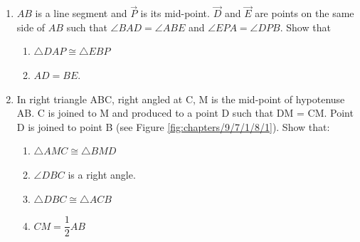 \begin{enumerate}[label=\thesection.\arabic*,ref=\thesection.\theenumi]
\\
\solution

\item 
	$AB$ is a line segment and $\vec{P}$ is its mid-point. $\vec{D}$ and $\vec{E}$ are points on the same side of
$AB$ such that $\angle BAD = \angle ABE$ and $\angle EPA = \angle DPB$. Show that
\label{chapters/9/7/1/7}
\begin{enumerate}
\item $\triangle DAP \cong \triangle EBP$
\item $AD = BE$.
\end{enumerate}
\solution

\item In right triangle ABC, right angled at C, M is the mid-point of hypotenuse AB. C is joined to M and produced to a point D such that DM = CM. Point D is joined to point B (see Figure \ref{fig:chapters/9/7/1/8/1}). Show that:
\begin{enumerate}
\item $\triangle AMC \cong \triangle BMD$
\item $\angle DBC$ is a right angle.
\item $\triangle DBC \cong \triangle ACB$
\item $CM = \dfrac{1}{2}AB$
\end{enumerate}
\label{chapters/9/7/1/8}


\end{enumerate}
